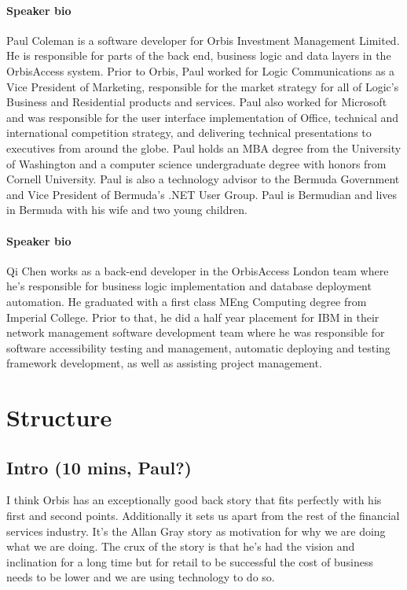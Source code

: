 \documentclass{article}
\begin{document}
\paragraph{Speaker bio}
Paul Coleman is a software developer for Orbis Investment Management
Limited.  He is responsible for parts of the back end, business logic
and data layers in the OrbisAccess system.
%
Prior to Orbis, Paul worked for Logic Communications as a Vice President
of Marketing, responsible for the market strategy for all of Logic's
Business and Residential products and services.
%
Paul also worked for Microsoft and was responsible for the user
interface implementation of Office, technical and international
competition strategy, and delivering technical presentations to
executives from around the globe.
%
Paul holds an MBA degree from the University of Washington and a
computer science undergraduate degree with honors from Cornell
University.  Paul is also a technology advisor to the Bermuda
Government and Vice President of Bermuda's .NET User Group.
%
Paul is Bermudian and lives in Bermuda with his wife and two young children.

\paragraph{Speaker bio} 
Qi Chen works as a back-end developer in the OrbisAccess London team
where he's responsible for business logic implementation and database
deployment automation.
%
He graduated with a first class MEng Computing degree from Imperial
College.
%
Prior to that, he did a half year placement for IBM in their network
management software development team where he was responsible for
software accessibility testing and management, automatic deploying and
testing framework development, as well as assisting project
management.

\section{Structure}
\subsection{Intro (10 mins, Paul?)}
I think Orbis has an exceptionally good back story that fits perfectly with his first and second points.  Additionally it sets us apart from the rest of the financial services industry.  It's the Allan Gray story as motivation for why we are doing what we are doing.  The crux of the story is that he's had the vision and inclination for a long time but for retail to be successful the cost of business needs to be lower and we are using technology to do so.
\end{document}
